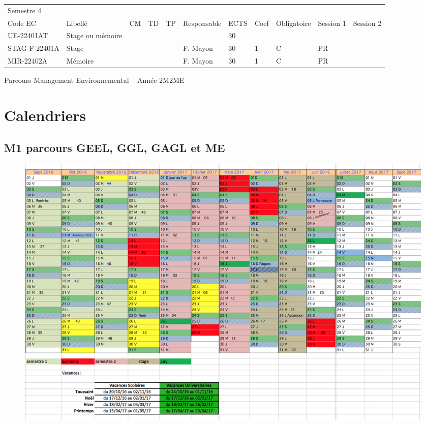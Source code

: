 \documentclass[a4paper,11pt]{article}
\begin{document}
{{\begin{tabular}{lllllllllll}
\rowcolor[HTML]{656565} 
Semestre 4    &                                                                   &    &    &    &                 &      &      &             &                &           \\
\rowcolor[HTML]{9B9B9B} 
Code EC       & Libellé                                                           & CM & TD & TP & Responsable     & ECTS & Coef & Obligatoire & Session 1      & Session 2 \\
\rowcolor[HTML]{C0C0C0} 
UE-22401AT    & Stage ou mémoire                                                  &    &    &    &                 & 30   &      &             &                &           \\
STAG-F-22401A & Stage                                                             &    &    &    & F. Mayon        & 30   & 1    & C           & PR             &           \\
MIR-22402A    & Mémoire                                                           &    &    &    & F. Mayon        & 30   & 1    & C           & PR             &          
\end{tabular}}
}{Parcours Management Environnemental -- Année 2}{M2ME}



\section{Calendriers}\label{Calendrier}

\subsection{M1 parcours GEEL, GGL, GAGL et ME}
\begin{figure}[H]
	\centering
		\includegraphics[width=1.4\textwidth, angle=90]{Calendriers/calendrierM1.png}
	\label{calM1}
\end{figure}
\end{document}
